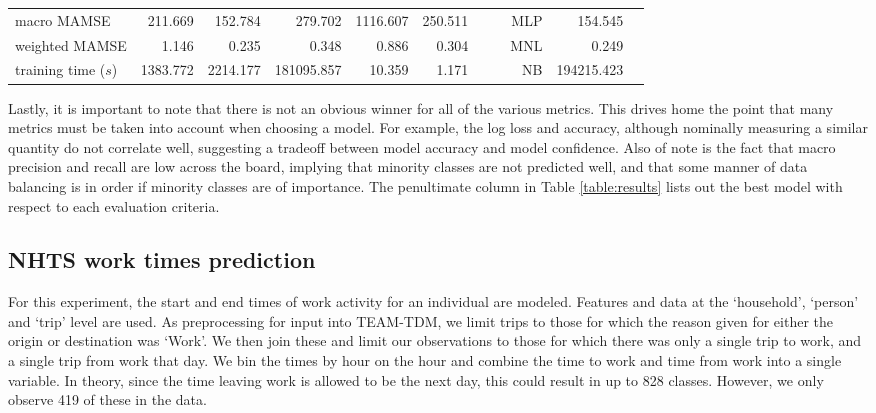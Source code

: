 \documentclass[numbered]{trbunofficial}
\begin{document}
{\begin{landscape}
\begin{table}[t]
\begin{center}
\begin{tabular}{l|rrrrrrr|r|r|r}
macro MAMSE                       &        211.669 &              152.784 &                                        279.702 &     1116.607 &           250.511 &&&   MLP&     154.545& \\
weighted MAMSE                    &          1.146 &                0.235 &                                          0.348 &        0.886 &             0.304 &&&  MNL&        0.249& \\
training time ($s$)                        &       1383.772 &             2214.177 &                181095.857 &       10.359 &             1.171 &&& NB&    194215.423& \\
\hline

\end{tabular}

\end{center}
\end{table}

    \end{landscape}
    \clearpage%
}
\newpage

Lastly, it is important to note that there is not an obvious winner for all of the various metrics.
 This drives home the point that many metrics must be taken into account when choosing a model.
 For example, the log loss and accuracy, although nominally measuring a similar quantity do not correlate well, suggesting a tradeoff between model accuracy and model confidence.
 Also of note is the fact that macro precision and recall are low across the board, implying that minority classes are not predicted well, and that some manner of data balancing is in order if minority classes are of importance.
 The penultimate column in Table \ref{table:results} lists out the best model with respect to each evaluation criteria.

\subsection{NHTS work times prediction}\label{subsection:work}

For this experiment, the start and end times of work activity for an individual are modeled.
 Features and data at the `household', `person' and `trip' level are used.
 As preprocessing for input into TEAM-TDM, we limit trips to those for which the reason given for either the origin or destination was `Work'.
 We then join these and limit our observations to those for which there was only a single trip to work, and a single trip from work that day.
 We bin the times by hour on the hour and combine the time to work and time from work into a single variable.
 In theory, since the time leaving work is allowed to be the next day, this could result in up to 828 classes.
 However, we only observe 419 of these in the data.
\end{document}
